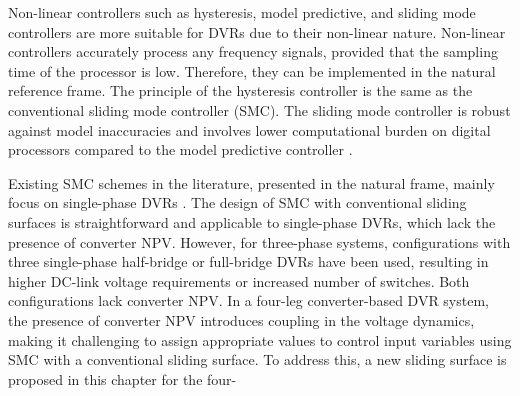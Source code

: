 Non-linear controllers such as hysteresis, model predictive, and sliding mode controllers are more suitable for DVRs due to their non-linear nature. Non-linear controllers accurately process any frequency signals, provided that the sampling time of the processor is low. Therefore, they can be implemented in the natural reference frame. The principle of the hysteresis controller \cite{8846889} is the same as the conventional sliding mode controller (SMC). The sliding mode controller is robust against model inaccuracies and involves lower computational burden on digital processors compared to the model predictive controller \cite{6939709}.

Existing SMC schemes in the literature, presented in the natural frame, mainly focus on single-phase DVRs \cite{9264672,7506128}. The design of SMC with conventional sliding surfaces is straightforward and applicable to single-phase DVRs, which lack the presence of converter NPV. However, for three-phase systems, configurations with three single-phase half-bridge \cite{7776961} or full-bridge \cite{8466115} DVRs have been used, resulting in higher DC-link voltage requirements or increased number of switches. Both configurations lack converter NPV. In a four-leg converter-based DVR system, the presence of converter NPV introduces coupling in the voltage dynamics, making it challenging to assign appropriate values to control input variables using SMC with a conventional sliding surface. To address this, a new sliding surface is proposed in this chapter for the four-
